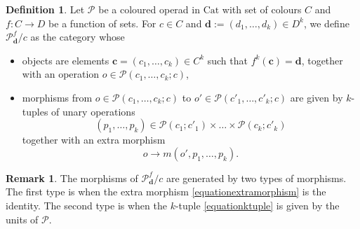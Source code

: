 \documentclass[]{amsart}
\theoremstyle{definition}
\newtheorem{definition}[theorem]{Definition}
\newtheorem{remark}[theorem]{Remark}
\begin{document}
\begin{definition}\cite[Definition 3.1]{delegergregocondensation}
	Let $\mathcal{P}$ be a coloured operad in $\mathrm{Cat}$ with set of colours $C$ and $f: C \to D$ be a function of sets. For $c \in C$ and $\mathbf{d} := (d_1,\ldots,d_k) \in D^k$, we define $\mathcal{P}_{\mathbf{d}}^f/c$ as the category whose
	\begin{itemize}
		\item objects are elements $\mathbf{c}=(c_1,\ldots,c_k) \in C^k$ such that $f^k(\mathbf{c})=\mathbf{d}$, together with an operation $o \in \mathcal{P}(c_1,\ldots,c_k;c)$,
		\item morphisms from $o \in \mathcal{P}(c_1,\ldots,c_k;c)$ to $o' \in \mathcal{P}(c'_1,\ldots,c'_k;c)$ are given by $k$-tuples of unary operations
		\begin{equation}\label{equationktuple}
		(p_1,\ldots,p_k) \in \mathcal{P}(c_1;c'_1) \times \ldots \times \mathcal{P}(c_k;c'_k)
		\end{equation}
		together with an extra morphism
		\begin{equation}\label{equationextramorphism}
			o \to m(o',p_1,\ldots,p_k).
		\end{equation}
	\end{itemize}
\end{definition}

\begin{remark}
	The morphisms of $\mathcal{P}_{\mathbf{d}}^f/c$ are generated by two types of morphisms. The first type is when the extra morphism \eqref{equationextramorphism} is the identity. The second type is when the $k$-tuple \eqref{equationktuple} is given by the units of $\mathcal{P}$.
\end{remark}
\end{document}
